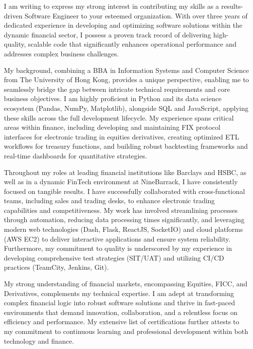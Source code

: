 \documentclass[11pt, a4paper]{article}
\begin{document}
\medskip %

I am writing to express my strong interest in contributing my skills as a results-driven Software Engineer to your esteemed organization. With over three years of dedicated experience in developing and optimizing software solutions within the dynamic financial sector, I possess a proven track record of delivering high-quality, scalable code that significantly enhances operational performance and addresses complex business challenges.

My background, combining a BBA in Information Systems and Computer Science from The University of Hong Kong, provides a unique perspective, enabling me to seamlessly bridge the gap between intricate technical requirements and core business objectives. I am highly proficient in Python and its data science ecosystem (Pandas, NumPy, Matplotlib), alongside SQL and JavaScript, applying these skills across the full development lifecycle. My experience spans critical areas within finance, including developing and maintaining FIX protocol interfaces for electronic trading in equities derivatives, creating optimized ETL workflows for treasury functions, and building robust backtesting frameworks and real-time dashboards for quantitative strategies.

Throughout my roles at leading financial institutions like Barclays and HSBC, as well as in a dynamic FinTech environment at NineBarrack, I have consistently focused on tangible results. I have successfully collaborated with cross-functional teams, including sales and trading desks, to enhance electronic trading capabilities and competitiveness. My work has involved streamlining processes through automation, reducing data processing times significantly, and leveraging modern web technologies (Dash, Flask, ReactJS, SocketIO) and cloud platforms (AWS EC2) to deliver interactive applications and ensure system reliability. Furthermore, my commitment to quality is underscored by my experience in developing comprehensive test strategies (SIT/UAT) and utilizing CI/CD practices (TeamCity, Jenkins, Git).

My strong understanding of financial markets, encompassing Equities, FICC, and Derivatives, complements my technical expertise. I am adept at transforming complex financial logic into robust software solutions and thrive in fast-paced environments that demand innovation, collaboration, and a relentless focus on efficiency and performance. My extensive list of certifications further attests to my commitment to continuous learning and professional development within both technology and finance.
\end{document}
